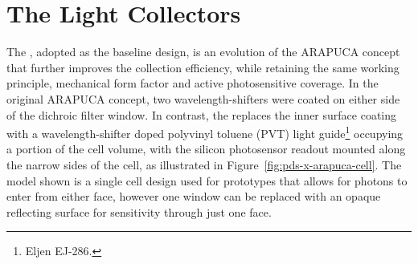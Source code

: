


\section{The Light Collectors}
\label{sec:fdsp-pd-lc}





The , adopted as the baseline design, is an evolution of the ARAPUCA concept that further improves the collection efficiency, while retaining the same working principle, mechanical form factor and active photosensitive coverage. 
 In the original ARAPUCA concept, two wavelength-shifters were coated on either side of the dichroic filter window. 
 In contrast, the  replaces the inner surface coating with a wavelength-shifter doped polyvinyl toluene (PVT)  light guide\footnote{Eljen EJ-286\texttrademark{}.} occupying a portion of the cell volume, with the silicon photosensor readout mounted along the narrow sides of the cell, as illustrated in Figure~\ref{fig:pds-x-arapuca-cell}. The model shown is a single cell design used for prototypes that allows for photons to enter from either face, however one window can be replaced with an opaque reflecting surface for sensitivity through just one face.

